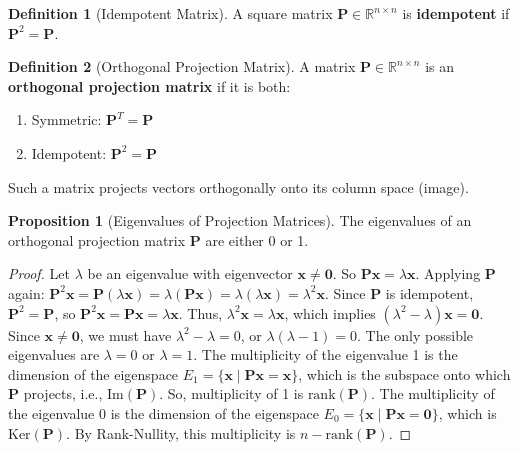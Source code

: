 \documentclass[12pt, letterpaper]{article}
\theoremstyle{definition}
\newtheorem{definition}{Definition}[section]
\newtheorem{proposition}{Proposition}[section]
\newcommand{\R}{\mathbb{R}}
\newcommand{\mat}[1]{\mathbf{#1}} %
\newcommand{\vect}[1]{\mathbf{#1}} %
\newcommand{\x}{\vect{x}} %
\newcommand{\im}{\text{Im}}
\newcommand{\Ker}{\text{Ker}}
\newcommand{\rank}{\text{rank}}
\begin{document}
\begin{definition}[Idempotent Matrix]
A square matrix $\mat{P} \in \R^{n \times n}$ is \textbf{idempotent} if $\mat{P}^2 = \mat{P}$.
\end{definition}

\begin{definition}[Orthogonal Projection Matrix]
A matrix $\mat{P} \in \R^{n \times n}$ is an \textbf{orthogonal projection matrix} if it is both:
\begin{enumerate}
    \item Symmetric: $\mat{P}^T = \mat{P}$
    \item Idempotent: $\mat{P}^2 = \mat{P}$
\end{enumerate}
Such a matrix projects vectors orthogonally onto its column space (image).
\end{definition}

\begin{proposition}[Eigenvalues of Projection Matrices]
The eigenvalues of an orthogonal projection matrix $\mat{P}$ are either 0 or 1.
\end{proposition}
\begin{proof}
Let $\lambda$ be an eigenvalue with eigenvector $\x \ne \vect{0}$. So $\mat{P}\x = \lambda \x$.
Applying $\mat{P}$ again: $\mat{P}^2 \x = \mat{P}(\lambda \x) = \lambda (\mat{P}\x) = \lambda (\lambda \x) = \lambda^2 \x$.
Since $\mat{P}$ is idempotent, $\mat{P}^2 = \mat{P}$, so $\mat{P}^2 \x = \mat{P}\x = \lambda \x$.
Thus, $\lambda^2 \x = \lambda \x$, which implies $(\lambda^2 - \lambda)\x = \vect{0}$. Since $\x \ne \vect{0}$, we must have $\lambda^2 - \lambda = 0$, or $\lambda(\lambda - 1) = 0$. The only possible eigenvalues are $\lambda = 0$ or $\lambda = 1$.
The multiplicity of the eigenvalue 1 is the dimension of the eigenspace $E_1 = \{\x \mid \mat{P}\x = \x\}$, which is the subspace onto which $\mat{P}$ projects, i.e., $\im(\mat{P})$. So, multiplicity of 1 is $\rank(\mat{P})$.
The multiplicity of the eigenvalue 0 is the dimension of the eigenspace $E_0 = \{\x \mid \mat{P}\x = \vect{0}\}$, which is $\Ker(\mat{P})$. By Rank-Nullity, this multiplicity is $n - \rank(\mat{P})$.
\end{proof}
\end{document}
